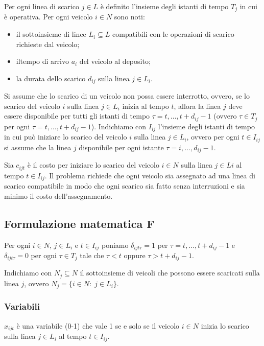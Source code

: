 Per ogni linea di scarico $j\in L$ è definito l'insieme degli istanti di tempo $T_{j}$ in cui è operativa.\newline
Per ogni veicolo $i\in N$ sono noti:
\begin{itemize}
	\item il sottoinsieme di linee $L_{i}\subseteq L$ compatibili con le operazioni di scarico richieste dal veicolo;
	\item iltempo di arrivo $a_{i}$ del veicolo al deposito;
	\item la durata dello scarico $d_{ij}$ sulla linea $j\in L_{i}$.
\end{itemize}
Si assume che lo scarico di un veicolo non possa essere interrotto, ovvero, se lo scarico del veicolo $i$ sulla linea $j\in L_{i}$ inizia al tempo $t$, allora la linea $j$ deve essere disponibile per tutti gli istanti di tempo $\tau=t,\dots,t+d_{ij}-1$ (ovvero $\tau \in T_{j}$ per ogni $\tau=t,\dots,t+d_{ij}-1$).
Indichiamo con $I_{ij}$ l'insieme degli istanti di tempo in cui può iniziare lo scarico del veicolo $i$ sulla linea $j\in L_{i}$, ovvero per ogni $t\in I_{ij}$ si assume che la linea $j$ disponibile per ogni istante $\tau=i,\dots,d_{ij}-1$.

Sia $c_{ijt}$ è il costo per iniziare lo scarico del veicolo $i\in N$ sulla linea $j\in L{i}$ al tempo $t\in I_{ij}$.\newline
Il problema richiede che ogni veicolo sia assegnato ad una linea di scarico compatibile in modo che ogni scarico sia fatto senza interruzioni e sia minimo il costo dell'assegnamento.

\subsection{Formulazione matematica F}
Per ogni $i\in N$, $j\in L_{i}$ e $t\in I_{ij}$ poniamo $\delta_{ijt\tau}=1$ per $\tau=t,\dots,t+d_{ij}-1$ e $\delta_{ijt\tau}=0$ per ogni $\tau\in T_{j}$ tale che $\tau < t$ oppure $\tau >t+d_{ij}-1$.

Indichiamo con $N_{j}\subseteq N$ il sottoinsieme di veicoli che possono essere scaricati sulla linea $j$, ovvero $N_{j}=\{i\in N:\;j\in L_{i}\}$.

\subsubsection{Variabili}
$x_{ijt}$ è una variabile (0-1) che vale 1 se e solo se il veicolo $i\in N$ inizia lo scarico sulla linea $j\in L_{i}$ al tempo $t\in I_{ij}$.

